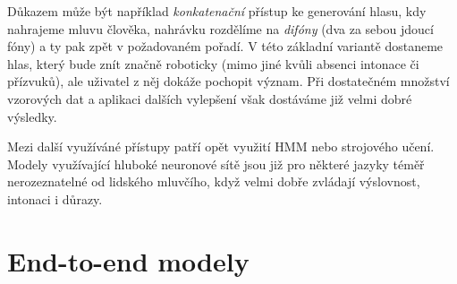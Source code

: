 Důkazem může být například
\textit{konkatenační} přístup ke generování hlasu, kdy nahrajeme mluvu člověka,
nahrávku rozdělíme na \textit{difóny} (dva za sebou jdoucí fóny) a ty pak
zpět  v požadovaném pořadí. V této základní variantě dostaneme
hlas, který bude znít značně roboticky (mimo jiné kvůli absenci intonace či
přízvuků), ale uživatel z něj dokáže pochopit význam. Při dostatečném množství
vzorových dat a aplikaci dalších vylepšení však dostáváme již velmi dobré
výsledky.

Mezi další využíváné přístupy patří opět využití HMM nebo strojového učení. Modely
využívající hluboké neuronové sítě jsou již pro některé jazyky téměř
nerozeznatelné od lidského mluvčího, když velmi dobře zvládají výslovnost,
intonaci i důrazy.

\section{End-to-end modely}